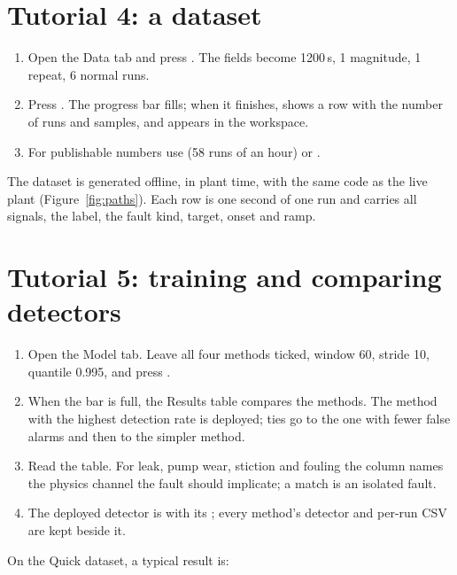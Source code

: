 \section{Tutorial 4: a dataset}

\begin{enumerate}
  \item Open the Data tab and press .
        The fields become 1200\,s, 1 magnitude, 1 repeat, 6 normal runs.
  \item Press . The progress bar fills; when it finishes,
         shows a  row with the number of runs
        and samples, and  appears in the workspace.
  \item For publishable numbers use  (58 runs of an hour) or
        .
\end{enumerate}

The dataset is generated offline, in plant time, with the same code as the
live plant (Figure~\ref{fig:paths}). Each row is one second of one run and
carries all signals, the label, the fault kind, target, onset and ramp.

\section{Tutorial 5: training and comparing detectors}

\begin{enumerate}
  \item Open the Model tab. Leave all four methods ticked, window 60,
        stride 10, quantile 0.995, and press .
  \item When the bar is full, the Results table compares the methods. The
        method with the highest detection rate is deployed; ties go to the one
        with fewer false alarms and then to the simpler method.
  \item Read the  table. For leak, pump wear, stiction and
        fouling the  column names the physics channel the fault
        should implicate; a match is an isolated fault.
  \item The deployed detector is  with its
        ; every method's detector and per-run CSV are kept
        beside it.
\end{enumerate}

On the Quick dataset, a typical result is:

